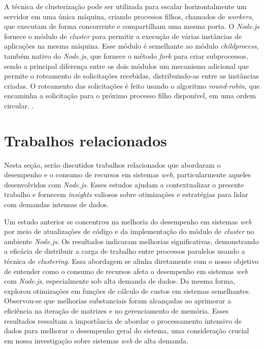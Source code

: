 \documentclass[12pt]{article}
\begin{document}
A técnica de clusterização pode ser utilizada para escalar horizontalmente um servidor em uma única máquina,
criando processos filhos, chamados de \textit{workers}, que executam de forma concorrente e compartilham uma mesma porta.
O \textit{Node.js} fornece o módulo de \textit{cluster} para permitir a execução de várias instâncias de aplicações na
mesma máquina. Esse módulo é semelhante ao módulo \textit{child\textunderscore process}, também nativo do \textit{Node.js},
que fornece o método \textit{fork} para criar subprocessos, sendo a principal diferença entre os dois módulos
um mecanismo adicional que permite o roteamento de solicitações recebidas, distribuindo-as entre as instâncias
criadas. O roteamento das solicitações é feito usando o algoritmo \textit{round-robin}, que encaminha a solicitação
para o próximo processo filho disponível, em uma ordem circular. \cite[p. 76]{DISTRIBUTEDNODE}.

\section{Trabalhos relacionados}

Nesta seção, serão discutidos trabalhos relacionados que abordaram o desempenho e o consumo de recursos 
em sistemas \textit{web}, particularmente aqueles desenvolvidos com \textit{Node.js}. Esses estudos ajudam a contextualizar 
o presente trabalho e fornecem \textit{insights} valiosos sobre otimizações e estratégias para lidar com demandas 
intensas de dados.

Um estudo anterior \cite{CLUSTERTCC} se concentrou na melhoria do desempenho em sistemas \textit{web} por meio de atualizações 
de código e da implementação do módulo de \textit{cluster} no ambiente \textit{Node.js}. Os resultados indicaram melhorias 
significativas, demonstrando a eficácia de distribuir a carga de trabalho entre processos paralelos usando a 
técnica de \textit{clustering}. Essa abordagem se alinha diretamente com o nosso objetivo de entender como o consumo 
de recursos afeta o desempenho em sistemas \textit{web} com \textit{Node.js}, especialmente sob alta demanda de dados.
Da mesma forma, \cite{CLUSTERTCC} explorou otimizações em funções de cálculo de custos em sistemas 
semelhantes. Observou-se que melhorias substanciais foram alcançadas ao aprimorar a eficiência na 
iteração de matrizes e no gerenciamento de memória. Esses resultados ressaltam a importância de abordar o 
processamento intensivo de dados para melhorar o desempenho geral do sistema, uma consideração crucial em 
nossa investigação sobre sistemas \textit{web} de alta demanda.
\end{document}
